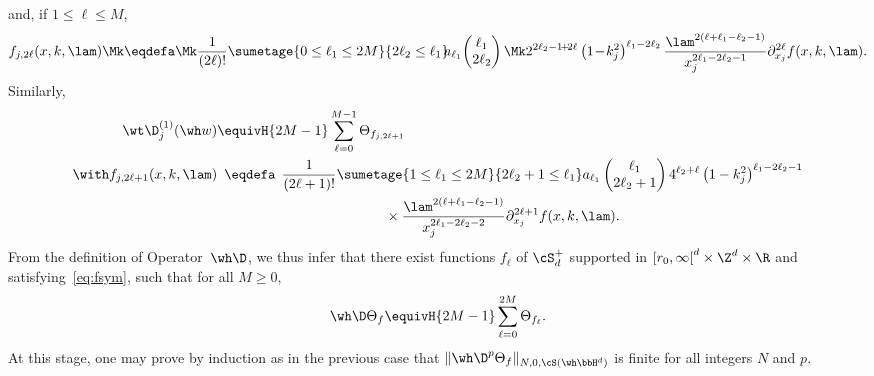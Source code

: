 and, if $1\leq\ell\leq M$,
\[
f_{j,2\ell} (x,k,\lam) \Mk\eqdefa\Mk \frac1{(2\ell)!}\sumetage {0\leq \ell_1\leq 2M} {2\ell_2\leq \ell_1} \!\!a_{\ell_1}\!
\begin{pmatrix} \ell_1 \\ 2\ell_2
\end{pmatrix}\Mk 2^{2\ell_2-1\!+\!2\ell} \left(1\!-\!k_j^2\right)^{\ell_1-2\ell_2} \frac { \lam^{2(\ell+\ell_1-\ell_2-1)}} {x_j^{2\ell_1-2\ell_2-1}} \partial_{x_j}^{2\ell}f(x,k,\lam).
\]
Similarly,
\begin{align*}
\wt \D_j^{(1)} (\wh w) &\equivH{2M-1} \sum_{\ell=0} ^{M-1} \Theta_{f_{j,2\ell+1}} \\ \with
f_{j,2\ell+1} (x,k,\lam) &\;\:\eqdefa\;\, \frac1{(2\ell+1)!}\sumetage {1\leq \ell_1\leq 2M} {2\ell_2+1\leq \ell_1} a_{\ell_1}
\begin{pmatrix} \ell_1 \\ 2\ell_2+1
\end{pmatrix} 4^{\ell_2+\ell} \left(1-k_j^2\right)^{\ell_1-2\ell_2-1}\\
&\qquad\qquad\qquad\qquad\qquad\qquad {}\times \frac { \lam^{2(\ell+\ell_1-\ell_2-1)}} {x_j^{2\ell_1-2\ell_2-2}} \partial_{x_j}^{2\ell+1}f(x,k,\lam).
\end{align*}
{}From the definition of Operator~$\wh \D$, we thus infer that there exist functions $f_\ell$ of $\cS_d^+$ supported in $[r_0,\infty\mathclose{[}^d\times\Z^d\times\R$ and satisfying~\eqref{eq:fsym}, such that for all $M\geq0$,
\[
\wh\D \Theta_f \equivH {2M-1} \sum_{\ell=0}^{2M} \Theta _{f_\ell}.
\]
At this stage, one may prove by induction as in the previous case that $\|\wh\D^p \Theta_f\|_{N,0,\cS(\wh\bbH^d)}$ is finite for all integers $N$ and $p$.


